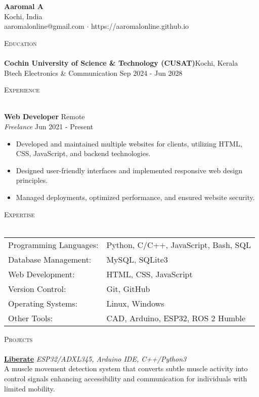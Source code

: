\documentclass[a4paper]{article}
\newcommand{\lineunder} {
    \vspace*{-8pt} \\
    \hspace*{-18pt} \hrulefill \\
}
\newcommand{\header} [1] {
    {\hspace*{-18pt}\vspace*{6pt} \textsc{#1}}
    \vspace*{-6pt} \lineunder
}
\newcommand{\contact} [3] {
    \vspace*{20pt} %
    \begin{center}
        {\Huge \textbf{#1}}\\
        \vspace{5pt} %
        #2 \\ #3
    \end{center}
    \vspace*{-8pt}
}
\begin{document}
\vspace*{-40pt}

\vspace*{-10pt}
\contact{Aaromal A}{Kochi, India}{aaromalonline@gmail.com $\cdot$ https://aaromalonline.github.io}

\header{Education}
\textbf{Cochin University of Science \& Technology (CUSAT)}\hfill Kochi, Kerala\\
Btech Electronics \& Communication \hfill Sep 2024 - Jun 2028\\
\vspace{2mm}

\header{Experience}
\vspace{1mm}

\textbf{Web Developer} \hfill Remote\\
\textit{Freelance} \hfill Jun 2021 - Present\\
\vspace{-1mm}
\begin{itemize} \itemsep 1pt
    \item Developed and maintained multiple websites for clients, utilizing HTML, CSS, JavaScript, and backend technologies.
    \item Designed user-friendly interfaces and implemented responsive web design principles.
    \item Managed deployments, optimized performance, and ensured website security.
\end{itemize}

\header{Expertise}
\begin{tabular}{ l l }
    Programming Languages: & Python, C/C++, JavaScript, Bash, SQL\\
    Database Management: & MySQL, SQLite3\\
    Web Development: & HTML, CSS, JavaScript\\
    Version Control: & Git, GitHub\\
    Operating Systems: & Linux, Windows\\
    Other Tools: & CAD, Arduino, ESP32, ROS 2 Humble\\
\end{tabular}
\vspace{2mm}

\header{Projects}

\href{https://github.com/aaromalonline/liberate}{\textbf{Liberate}} {\sl ESP32/ADXL345, Arduino IDE, C++/Python3} \\
A muscle movement detection system that converts subtle muscle activity into control signals enhancing accessibility and communication for individuals with limited mobility.\\
\vspace*{2mm}
\end{document}

